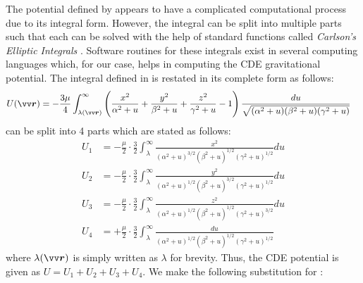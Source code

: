 %
\newline\newline
%
The potential defined by  appears to have a complicated computational process due to its integral form. However, the integral can be split into multiple parts such that each can be solved with the help of standard functions called \textit{Carlson's Elliptic Integrals} \parencite{carlsonEllipticIntegral}. Software routines for these integrals exist in several computing languages which, for our case, helps in computing the \gls{CDE} gravitational potential. The integral defined in  is restated in its complete form as follows:
\begin{align}
    U(\bvector{r}) &= -\frac{3\mu}{4} \int_{\lambda(\bvector{r})}^{\infty} \left(\frac{x^2}{\alpha^2 + u} + \frac{y^2}{\beta^2 + u} + \frac{z^2}{\gamma^2 + u} - 1\right) \frac{du}{\sqrt{(\alpha^2 + u)(\beta^2 + u)(\gamma^2 + u)}}
    \label{eqn:ellipsoid_potential_long_form}
\end{align}
 can be split into 4 parts which are stated as follows:
\begin{align}
    U_1 &= -\frac{\mu}{2} \cdotp \frac{3}{2} \int_{\lambda}^{\infty} \frac{x^2}{(\alpha^2 + u)^{3/2}(\beta^2 + u)^{1/2}(\gamma^2 + u)^{1/2}} du
    \label{eqn:ellipsoid_potential_split_1}\\
    U_2 &= -\frac{\mu}{2} \cdotp \frac{3}{2} \int_{\lambda}^{\infty} \frac{y^2}{(\alpha^2 + u)^{1/2}(\beta^2 + u)^{3/2}(\gamma^2 + u)^{1/2}} du
    \label{eqn:ellipsoid_potential_split_2}\\
    U_3 &= -\frac{\mu}{2} \cdotp \frac{3}{2} \int_{\lambda}^{\infty} \frac{z^2}{(\alpha^2 + u)^{1/2}(\beta^2 + u)^{1/2}(\gamma^2 + u)^{3/2}} du
    \label{eqn:ellipsoid_potential_split_3}\\
    U_4 &= +\frac{\mu}{2} \cdotp \frac{3}{2} \int_{\lambda}^{\infty} \frac{du}{(\alpha^2 + u)^{1/2}(\beta^2 + u)^{1/2}(\gamma^2 + u)^{1/2}}
    \label{eqn:ellipsoid_potential_split_4}
\end{align}
where $\lambda{(\bvector{r})}$ is simply written as $\lambda$ for brevity. Thus, the \gls{CDE} potential is given as $U = U_1 + U_2 + U_3 + U_4$. We make the following substitution for :
